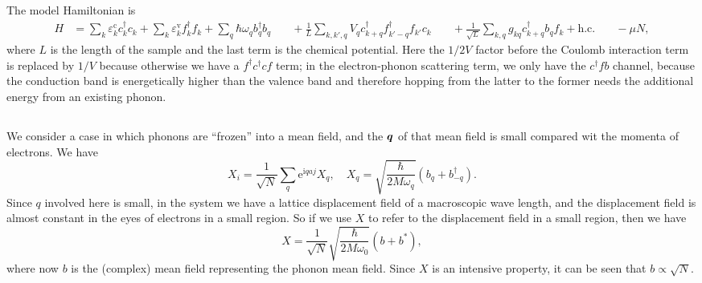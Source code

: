\documentclass[hyperref, a4paper]{article}
\newcommand*{\ii}{\mathrm{i}}
\newcommand*{\ee}{\mathrm{e}}
\def\\{}%
\begin{document}
The model Hamiltonian is 
\begin{equation}
    \begin{aligned}
        H &= \sum_k \varepsilon_k^{\text{c}} c_k^\dagger c_k + 
        \sum_k \varepsilon_k^{\text{v}} f_k^\dagger f_k
        + \sum_q \hbar \omega_q b^\dagger_q b_q \\
        &\quad + \frac{1}{L} \sum_{k, k', q} V_q c^\dagger_{k+q} f^\dagger_{k'-q} f_{k'} c_{k} \\
        &\quad + \frac{1}{\sqrt{L}} \sum_{k, q} g_{kq} c^\dagger_{k+q} b_{q} f_{k} + \text{h.c.} \\
        &\quad - \mu N,
    \end{aligned}
\end{equation}
where $L$ is the length of the sample 
and the last term is the chemical potential.
Here the $1/2V$ factor before the Coulomb interaction term
is replaced by $1/V$ because otherwise we have a $f^\dagger c^\dagger c f$ term;
in the electron-phonon scattering term, 
we only have the $c^\dagger f b$ channel,
because the conduction band is energetically higher than the valence band 
and therefore hopping from the latter to the former 
needs the additional energy from an existing phonon.

\subsection{}



\subsection{}

We consider a case in which phonons are ``frozen'' into a mean field, 
and the $\vb*{q}$ of that mean field is small compared 
wit the momenta of electrons.
We have
\begin{equation}
    X_i = \frac{1}{\sqrt{N}} \sum_q \ee^{\ii q a j} X_q , \quad 
    X_q = \sqrt{\frac{\hbar}{2 M \omega_q}} (b_q + b_{-q}^\dagger).
\end{equation}
Since $q$ involved here is small, 
in the system we have a lattice displacement field 
of a macroscopic wave length,
and the displacement field is almost constant in the eyes 
of electrons in a small region.
So if we use $X$ to refer to the displacement field in a small region, 
then we have 
\begin{equation}
    X = \frac{1}{\sqrt{N}} \sqrt{\frac{\hbar}{2 M \omega_0}} (b + b^*),
\end{equation}
where now $b$ is the (complex) mean field 
representing the phonon mean field.
Since $X$ is an intensive property,
it can be seen that $b \propto \sqrt{N}$.
\end{document}
